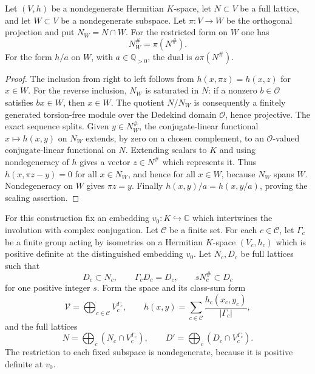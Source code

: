 \begin{lemma}\label{div:cut-dual}
Let $(V,h)$ be a nondegenerate Hermitian $K$-space, let $N\subset V$
be a full lattice, and let $W\subset V$ be a nondegenerate subspace.
Let $\pi:V\to W$ be the orthogonal projection and put $N_W=N\cap W$.
For the restricted form on $W$ one has
\[
                       N_W^\#=\pi(N^\#).
\]
For the form $h/a$ on $W$, with $a\in\mathbb Q_{>0}$, the dual is
$a\pi(N^\#)$.
\end{lemma}
\begin{proof}
The inclusion from right to left follows from
$h(x,\pi z)=h(x,z)$ for $x\in W$.
For the reverse inclusion, $N_W$ is saturated in $N$: if a nonzero
$b\in\mathcal O$ satisfies $bx\in W$, then $x\in W$.
The quotient $N/N_W$ is consequently a finitely generated torsion-free
module over the Dedekind domain $\mathcal O$, hence projective. The
exact sequence splits. Given $y\in N_W^\#$, the conjugate-linear
functional $x\mapsto h(x,y)$ on $N_W$ extends, by zero on a chosen
complement, to an $\mathcal O$-valued conjugate-linear functional on
$N$. Extending scalars to $K$ and using nondegeneracy of $h$ gives a
vector $z\in N^\#$ which represents it. Thus
$h(x,\pi z-y)=0$ for all $x\in N_W$, and hence for all $x\in W$,
because $N_W$ spans $W$. Nondegeneracy on $W$ gives $\pi z=y$.
Finally $h(x,y)/a=h(x,y/a)$, proving the scaling assertion.
\end{proof}

For this construction fix an embedding $v_0:K\hookrightarrow\mathbb C$
which intertwines the involution with complex conjugation.
Let $\mathcal C$ be a finite set. For each $c\in\mathcal C$, let
$\Gamma_c$ be a finite group acting by isometries on a Hermitian
$K$-space $(V_c,h_c)$ which is positive definite at the distinguished
embedding $v_0$. Let $N_c,D_c$ be full lattices such that
\begin{equation}\label{div:class-lattices}
 D_c\subset N_c,\qquad \Gamma_cD_c=D_c,\qquad
                         sN_c^\#\subset D_c
\end{equation}
for one positive integer $s$. Form the space and its class-sum form
\[
 \mathcal V=\bigoplus_{c\in\mathcal C}V_c^{\Gamma_c},\qquad
 h(x,y)=\sum_{c\in\mathcal C}\frac{h_c(x_c,y_c)}{|\Gamma_c|},
\]
and the full lattices
\[
 N=\bigoplus_c(N_c\cap V_c^{\Gamma_c}),\qquad
 D'=\bigoplus_c(D_c\cap V_c^{\Gamma_c}).
\]
The restriction to each fixed subspace is nondegenerate, because it
is positive definite at $v_0$.


